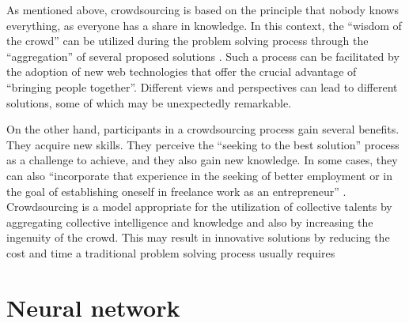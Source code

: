   As mentioned above, crowdsourcing is based on the principle that nobody knows everything, as everyone has a share in knowledge. In this context, the “wisdom of the crowd” can be utilized during the problem solving process through the “aggregation” of several proposed solutions \cite{doi101177}. Such a process can be facilitated by the adoption of new web technologies that offer the crucial advantage of “bringing people together”. Different views and perspectives can lead to different solutions, some of which may be unexpectedly remarkable.
  
  
  On the other hand, participants in a crowdsourcing process gain several benefits. They acquire new skills. They perceive the “seeking to the best solution” process as a challenge to achieve, and they also gain new knowledge. In some cases, they can also “incorporate that experience in the seeking of better employment or in the goal of establishing oneself in freelance work as an entrepreneur” \cite{doi101177}. Crowdsourcing is a model appropriate for the utilization of collective talents by aggregating collective intelligence and knowledge and also by increasing the ingenuity of the crowd. This may result in innovative solutions by reducing the cost and time a traditional problem solving process usually requires \cite{doi101177}

\section{Neural network}

